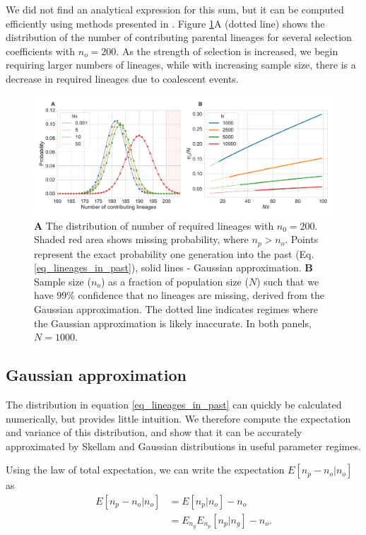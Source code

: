 \documentclass[review,nonatbib]{elsarticle}
\begin{document}
We did not find an analytical expression for this sum, but it can be computed
efficiently using methods presented in \citep{ONeill2019}. Figure \ref{fig_combined}A (dotted line) shows
the distribution of the number of contributing parental lineages for several selection coefficients
with $n_o=200$.
As the strength of selection
is increased, we begin requiring larger numbers of lineages, while with increasing sample size,
there is a decrease in required lineages due to coalescent events.

\begin{figure}
  \centering
  \includegraphics[width=\textwidth]{fig/combined.pdf}
  \caption{\textbf{A} The distribution of number of required lineages with $n_0=200$. Shaded
    red area shows missing probability, where $n_p > n_o$. Points represent the exact probability one
    generation into the past (Eq. \ref{eq_lineages_in_past}), solid lines - Gaussian approximation.
     \textbf{B} Sample size ($n_o$) as a fraction of population size ($N$)
    such that we have $99\%$ confidence that no lineages are missing, derived from the Gaussian
    approximation. The dotted line indicates regimes where the Gaussian approximation is likely inaccurate.
     In both panels, $N=1000$.}
  \label{fig_combined}
\end{figure}

\subsection{Gaussian approximation}
\label{subsec_gaussian}

The distribution in equation \ref{eq_lineages_in_past} can quickly be calculated numerically, but
provides little intuition. We therefore compute the
expectation and variance of this distribution, and show that it can be accurately approximated by
Skellam and Gaussian distributions in useful parameter regimes.

Using the law of total expectation, we can write the expectation $E[n_p-n_o | n_o]$ as
\begin{equation*}
  \begin{aligned}
    \label{eq_lineages_approx}
    E[n_p-n_o | n_o] &=        E[n_p | n_o]       - n_o \\
                     &=E_{n_g} E_{n_p}[n_p | n_g] - n_o.
  \end{aligned}
\end{equation*}
\end{document}
